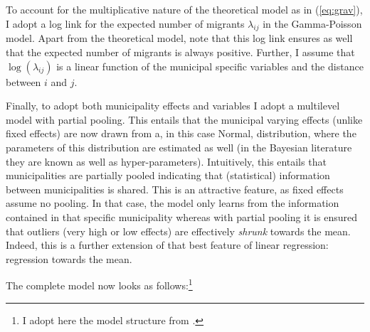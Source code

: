 \documentclass[fleqn,10pt]{SelfArx} %
\begin{document}
        To account for the multiplicative nature of the theoretical model as in
        (\ref{eq:grav}), I adopt a log link for the expected number of migrants
        $\lambda_{ij}$ in the Gamma-Poisson model.  Apart from the theoretical
        model, note that this log link ensures as well that the expected number
        of migrants is always positive.  Further, I assume that
        $\log(\lambda_{ij})$ is a linear function of the municipal specific
        variables and the distance between $i$ and $j$.

        Finally, to adopt both municipality effects and variables I adopt a
        multilevel model with partial pooling. This entails that the municipal
        varying effects (unlike fixed effects) are now drawn from a, in this
        case Normal, distribution, where the parameters of this distribution are
        estimated as well (in the Bayesian literature they are known as well as
        hyper-parameters).  Intuitively, this entails that municipalities are
        partially pooled indicating that (statistical) information between
        municipalities is shared. This is an attractive feature, as fixed
        effects assume no pooling. In that case, the model only learns from the
        information contained in that specific municipality whereas with partial
        pooling it is ensured that outliers (very high or low effects) are
        effectively \emph{shrunk} towards the mean. Indeed, this is a further
        extension of that best feature of linear regression: regression towards
        the mean.

        The complete model now looks as follows:\footnote{I adopt here the model structure from \citet{mcelreath2018statistical}.}
        
\end{document}

